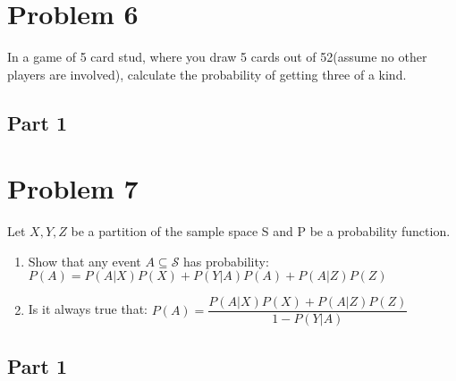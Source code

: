 \documentclass{article}
\begin{document}
\clearpage
\section*{Problem 6}
In a game of 5 card stud, where you draw 5 cards out of 52(assume no other players are involved), calculate the probability of getting three of a kind.
\subsection*{Part 1}

\clearpage
\section*{Problem 7}
Let $X,Y,Z$ be a partition of the sample space S and P be a probability function.

    \begin{enumerate}
    \item
    Show that any event $A\subseteq \mathcal{S}$ has probability: $P(A) = P(A|X)P(X)+P(Y|A)P(A)+P(A|Z)P(Z)$
    \item
    Is it always true that: $P(A) = \dfrac{P(A|X)P(X)+P(A|Z)P(Z)}{1-P(Y|A)}$
    \end{enumerate}
\subsection*{Part 1}
\end{document}
